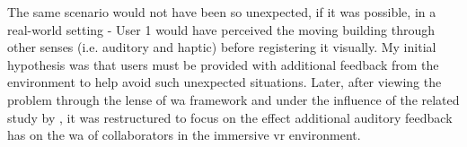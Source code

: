 The same scenario would not have been so unexpected, if it was possible, in a real-world setting - User 1 would have perceived the moving building through other senses (i.e. auditory and haptic) before registering it visually. 
My initial hypothesis was that users must be provided with additional feedback from the environment to help avoid such unexpected situations. Later, after viewing the problem through the lense of \gls{wa} framework and under the influence of the related study by \cite{gutwin_chalk_2011},  it was restructured to focus on the effect additional auditory feedback has on the \gls{wa} of collaborators in the immersive \gls{vr} environment.

 

